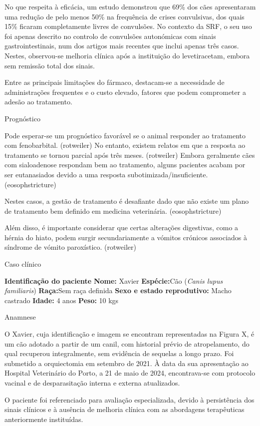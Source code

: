 No que respeita à eficácia, um estudo demonstrou que 69\% dos cães apresentaram uma redução de pelo menos 50\% na frequência de crises convulsivas, dos quais 15\% ficaram completamente livres de convulsões.\cite{Packer2015} No contexto da SRF, o seu uso foi apenas descrito no controlo de convulsões autonómicas com sinais gastrointestinais, num dos artigos mais recentes que inclui apenas três casos. Nestes, observou-se melhoria clínica após a instituição do levetiracetam, embora sem remissão total dos sinais.\cite{Diop2025}


Entre as principais limitações do fármaco, destacam-se a necessidade de administrações frequentes e o custo elevado, \cite{ajvr} fatores que podem comprometer a adesão ao tratamento.

Prognóstico


Pode esperar-se um prognóstico favorável se o animal responder ao tratamento com fenobarbital. (rotweiler) No entanto, existem relatos em que a resposta ao tratamento se tornou parcial após três meses. (rotweiler) Embora geralmente cães com sialoadenose respondam bem ao tratamento, alguns pacientes acabam por ser eutanasiados devido a uma resposta subotimizada/insuficiente. (eosophstricture) 

Nestes casos, a gestão de tratamento é desafiante dado que não existe um plano de tratamento bem definido em medicina veterinária. (eosophstricture)


Além disso, é importante considerar que certas alterações digestivas, como a hérnia do hiato, podem surgir secundariamente a vómitos crónicos associados à síndrome de vómito paroxístico. (rotweiler)


Caso clínico


\textbf{Identificação do paciente}
\textbf{Nome:} Xavier
\textbf{Espécie:}Cão (\textit{Canis lupus familiaris})
\textbf{Raça:}Sem raça definida
\textbf{Sexo e estado reprodutivo:} Macho castrado
\textbf{Idade:} 4 anos
\textbf{Peso:} 10 kgs

Anamnese

O Xavier, cuja identificação e imagem se encontram representadas na Figura X, é um cão adotado a partir de um canil, com historial prévio de atropelamento, do qual recuperou integralmente, sem evidência de sequelas a longo prazo.  Foi submetido a orquiectomia em setembro de 2021. À data da sua apresentação ao Hospital Veterinário do Porto, a 21 de maio de 2024, encontrava-se com protocolo vacinal e de desparasitação interna e externa atualizados.


O paciente foi referenciado para avaliação especializada, devido à persistência dos sinais clínicos e à ausência de melhoria clínica com as abordagens terapêuticas anteriormente instituídas.


